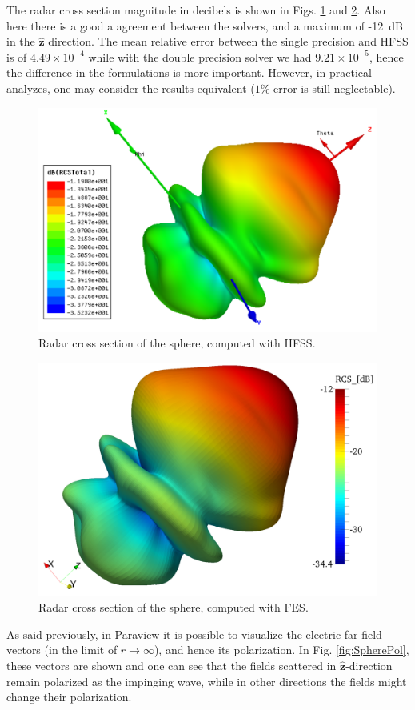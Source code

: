 The radar cross section magnitude in decibels is shown in Figs. \ref{fig:SphereRCSHFSS} and \ref{fig:SphereRCS}. Also here there is a good a agreement between the solvers, and a maximum of -12~dB in the $\hat{\mathbf{z}}$ direction. The mean relative error between the single precision and HFSS is of $4.49\times 10^{-4}$ while with the double precision solver we had $9.21\times 10^{-5}$, hence the difference in the formulations is more important. However, in practical analyzes, one may consider the results equivalent ($1\%$ error is still neglectable).

\begin{figure}[h]
\centering
\includegraphics[width=13.5cm]{SphereRCSHFSS}
\caption{Radar cross section of the sphere, computed with HFSS.}
\label{fig:SphereRCSHFSS}
\end{figure}

\begin{figure}[h]
\centering
\includegraphics[width=11.7cm]{SphereRCS}
\caption{Radar cross section of the sphere, computed with FES.}
\label{fig:SphereRCS}
\end{figure}
\clearpage
As said previously, in Paraview it is possible to visualize the electric far field vectors (in the limit of $r\rightarrow \infty$), and hence its polarization. In Fig. \ref{fig:SpherePol}, these vectors are shown and one can see that the fields scattered in $\hat{\mathbf{z}}$-direction remain polarized as the impinging wave, while in other directions the fields might change their polarization.

